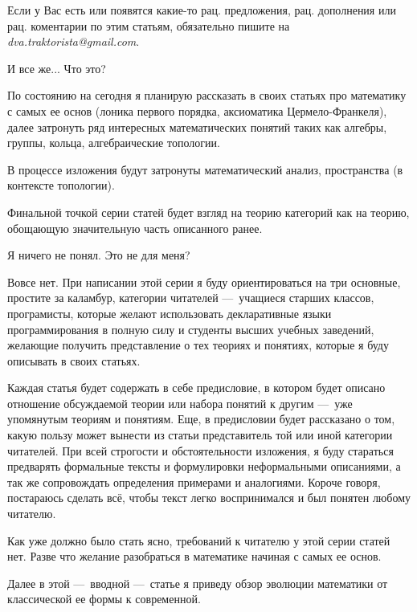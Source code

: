 \documentclass[math.tex]{subfiles}
\begin{document}
	
	Если у Вас есть или появятся какие-то рац. предложения, рац. дополнения или рац. коментарии по этим статьям, обязательно пишите на \emph{dva.traktorista@gmail.com}.

	\vspace{1cm}
	\LARGE{И все же... Что это?}\\
	\normalsize
	
	По состоянию на сегодня я планирую рассказать в своих статьях про математику с самых ее основ (лоника первого порядка, аксиоматика Цермело-Франкеля), далее затронуть ряд интересных математических понятий таких как алгебры, группы, кольца, алгебраические топологии. 
	
	В процессе изложения будут затронуты мат\-ематический анализ, пространства (в контексте топологии).
	
	Финальной точкой серии статей будет взгляд на теорию категорий как на теорию, обощающую значительную часть описанного ранее.
	
	\vspace{1cm}
	\LARGE{Я ничего не понял. Это не для меня?}\\
	\normalsize
	
	Вовсе нет. 
При написании этой серии я буду ориентироваться на три основные, простите за каламбур, категории читателей —\ учащиеся старших классов, програ\-мисты, которые желают использовать деклар\-ативные языки программирования в полную силу и студенты высших учебных заведений, желающие получить пред\-ставление о тех теориях и понятиях, которые я буду описывать в своих статьях.
	
	Каждая статья будет содержать в себе предисловие, в котором будет описано отношение обсуждаемой теории или набора понятий к другим —\ уже упомянутым теориям и понятиям. 
Еще, в предисловии будет рассказано о том, какую пользу может вынести из статьи представитель той или
иной категории читателей.
При всей строгости и обстоятельности изложения, я буду стараться предварять фор\-мальные тексты и формулировки неформальными описаниями, а так же сопро\-вождать опре\-деления примерами и аналогиями.
Короче говоря, постараюсь сделать всё, чтобы текст легко воспринимался и был понятен любому читателю.

	Как уже должно было стать ясно, требований к читателю у этой серии статей нет. Разве что
желание разобраться в математике начиная с самых ее основ.
	
	Далее в этой —\ вводной —\ статье я приведу обзор эволюции математики от классической ее формы
к современной.
	
\end{document}

